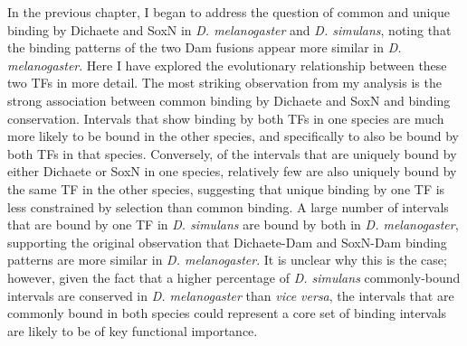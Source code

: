 In the previous chapter, I began to address the question of common and unique binding by Dichaete and SoxN in \emph{D. melanogaster} and \emph{D. simulans}, noting that the binding patterns of the two Dam fusions appear more similar in \emph{D. melanogaster}. Here I have explored the evolutionary relationship between these two TFs in more detail. The most striking observation from my analysis is the strong association between common binding by Dichaete and SoxN and binding conservation. Intervals that show binding by both TFs in one species are much more likely to be bound in the other species, and specifically to also be bound by both TFs in that species. Conversely, of the intervals that are uniquely bound by either Dichaete or SoxN in one species, relatively few are also uniquely bound by the same TF in the other species, suggesting that unique binding by one TF is less constrained by selection than common binding. A large number of intervals that are bound by one TF in \emph{D. simulans} are bound by both in \emph{D. melanogaster}, supporting the original observation that Dichaete-Dam and SoxN-Dam binding patterns are more similar in \emph{D. melanogaster}. It is unclear why this is the case; however, given the fact that a higher percentage of \emph{D. simulans} commonly-bound intervals are conserved in \emph{D. melanogaster} than \emph{vice versa}, the intervals that are commonly bound in both species could represent a core set of binding intervals are likely to be of key functional importance.

